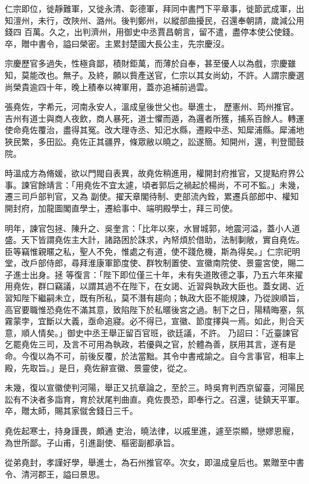 \begin{pinyinscope}
 仁宗即位，徙靜難軍，又徙永清、彰德軍，拜同中書門下平章事，徙節武成軍，出知澶州，未行，改陜州、潞州。後判鄭州，以縱部曲擾民，召還奉朝請，歲減公用錢四
 百萬。久之，出判濟州，用御史中丞賈昌朝言，留不遣，盡停本使公使錢。卒，贈中書令，謚曰榮密。主累封楚國大長公主，先宗慶沒。



 宗慶歷官多過失，性極貪鄙，積財鉅萬，而薄於自奉，甚至優人以為戲，宗慶雖知，莫能改也。無子。及終，願以貲產送官，仁宗以其女尚幼，不許。人謂宗慶選尚榮貴逾四十年，晚上積奉以裨軍用，蓋亦追補前過雲。



 張堯佐，字希元，河南永安人，溫成皇後世父也。舉進士，
 歷憲州、筠州推官。吉州有道士與商人夜飲，商人暴死，道士懼而遁，為邏者所獲，捕系百餘人。轉運使命堯佐覆治，盡得其冤。改大理寺丞、知汜水縣，遷殿中丞、知犀浦縣。犀浦地狹民繁，多田訟。堯佐正其疆界，條眾敝以曉之，訟遂簡。知開州，還，判登聞鼓院。



 時溫成方為脩媛，欲以門閥自表異，故堯佐稍進用，權開封府推官，又提點府界公事。諫官餘靖言：「用堯佐不宜太遽，頃者郭后之禍起於楊尚，不可不監。」未幾，遷三司戶部判官，又為
 副使。擢天章閣待制、吏部流內銓，累遷兵部郎中、權知開封府，加龍圖閣直學士，遷給事中、端明殿學士，拜三司使。



 明年，諫官包拯、陳升之、吳奎言：「比年以來，水冒城郭，地震河溢，蓋小人道盛。天下皆謂堯佐主大計，諸路困於誅求，內帑煩於借助，法制剚敞，實自堯佐。臣等竊惟親暱之私，聖人不免，惟處之有道，使不踐危機，斯為得矣。」仁宗祀明堂，改戶部侍郎，尋拜淮康軍節度使、群牧制置使、宣徽南院使、景靈宮使，賜二子進士出身。拯
 等復言：「陛下即位僅三十年，未有失道敗德之事，乃五六年來擢用堯佐，群口竊議，以謂其過不在陛下，在女謁、近習與執政大臣也。蓋女謁、近習知陛下繼嗣未立，既有所私，莫不潛有趨向；執政大臣不能規諫，乃從諛順旨，高官要職惟恐堯佐不滿其意，致陷陛下於私暱後宮之過。制下之日，陽精晦塞，氛霧蒙孛，宜斷以大義，亟命追寢。必不得已，宣徽、節度擇與一焉。如此，則合天意，順人情矣。」御史中丞王舉正留百官班，欲廷議，不許。
 乃詔曰：「近臺諫官乞罷堯佐三司，及言不可用為執政，若優與之官，於體為善，朕用其言，遂有是命。今復以為不可，前後反覆，於法當黜。其令中書戒諭之。自今言事官，相率上殿，先取旨。」是日，堯佐辭宣徽、景靈使，從之。



 未幾，復以宣徽使判河陽，舉正又抗章論之，至於三。時吳育判西京留臺，河陽民訟有不決者多詣育，育於狀尾判曲直。堯佐畏恐，即奉行之。召還，徒鎮天平軍。卒，贈太師，賜其家僦舍錢日三千。



 堯佐起寒士，持身謹畏，頗通
 吏治，曉法律，以戚里進，遽至崇顯，戀嫪恩寵，為世所鄙。子山甫，引進副使、樞密副都承旨。



 從弟堯封，孝謹好學，舉進士，為石州推官卒。次女，即溫成皇后也。累贈至中書令、清河郡王，謚曰景思。



\end{pinyinscope}